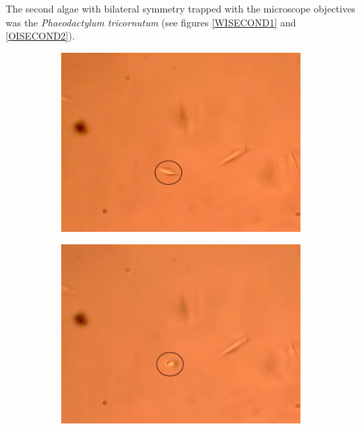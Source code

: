 \documentclass[letterpaper,12pt,oneside]{book}
\begin{document}
\noindent The second algae with bilateral symmetry trapped with the microscope objectives was the \textit{Phaeodactylum tricornutum} (see figures \ref{WISECOND1} and \ref{OISECOND2}).
\begin{figure}[H] 
  \begin{subfigure}[b]{0.5\linewidth}
    \centering
    \includegraphics[scale=0.20]{Results/Resultadosalgea2/firstwatter secondalgea.png} 
    \caption{}
    \label{fig7:a} 
    \vspace{4ex}
  \end{subfigure}%
  \begin{subfigure}[b]{0.5\linewidth}
    \centering
    \includegraphics[scale=0.20]{Results/Resultadosalgea2/secondalgea2water.png} 

\end{subfigure}
\end{figure}
\end{document}
